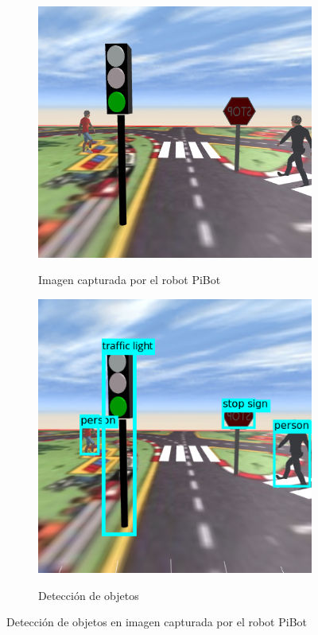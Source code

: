 \documentclass{report}
\begin{document}
\renewcommand{\figurename}{Figura}		
\begin{figure}[!h]
\centering
  \begin{subfigure}[b]{0.49\textwidth}
  \centering
    \includegraphics[scale=0.342]{images/cap4/sin-deteccion.jpg}
    \label{fig:f1}
    \caption{Imagen capturada por el robot PiBot}
  \end{subfigure}
  \hfill
  \begin{subfigure}[b]{0.49\textwidth}
  \centering
    \includegraphics[scale=0.4]{images/cap4/con-detection.jpg}
    \label{fig:f2}
    \caption{Detección de objetos}
  \end{subfigure}
  \caption{Detección de objetos  en imagen capturada por el robot PiBot}
\end{figure}
\end{document}
